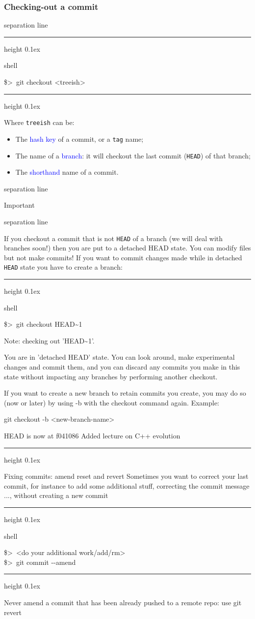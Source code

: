 \documentclass[hyperref={colorlinks}]{beamer}
\newenvironment{shell}{%
\footnotesize\flushleft\hrule height 0.1ex
\tt\begin{beamercolorbox}[sep=1ex,left]{shell}%
}{%
\end{beamercolorbox}
\hrule height 0.1ex
\endflushleft\par
}
\newcommand*{\psone}[1][ant]{\$>~}
\newcommand{\titleline}[1][0.025cm]{%
\begin{beamercolorbox}[wd=\paperwidth,ht=#1,center]{separation line}%
\end{beamercolorbox}%
}
\begin{document}
\begin{frame}
  \frametitle{Checking-out a commit}
\titleline
  \begin{shell}
    \psone git checkout <treeish> 
  \end{shell}

  Where \texttt{treeish} can be:
  \begin{itemize}
  \item The \textcolor{blue}{hash key} of a commit, or a \texttt{tag} name;
  \item The name of a \textcolor{blue}{branch}: it will checkout the
    last commit (\texttt{HEAD}) of that branch;
  \item The \textcolor{blue}{shorthand} name of a commit.
  \end{itemize}
\titleline
\end{frame}

\begin{frame}{Important}
  \titleline
  If you checkout a commit that is not \texttt{HEAD} of a branch (we
  will deal with branches soon!) then you are put to a \alert{detached
    HEAD state}. You can modify files but not make
  commits! If you want to commit changes made while in detached \texttt{HEAD} state you have to create a branch:
  \small
  \begin{shell}
\psone git checkout HEAD\textasciitilde{}1

Note: checking out 'HEAD\textasciitilde{}1'.

You are in 'detached HEAD' state. You can look around, make experimental
changes and commit them, and you can discard any commits you make in this
state without impacting any branches by performing another checkout.

If you want to create a new branch to retain commits you create, you may
do so (now or later) by using -b with the checkout command again. Example:

  git checkout -b <new-branch-name>

HEAD is now at f041086 Added lecture on C++ evolution
  \end{shell}

\end{frame}
\begin{frame}{Fixing commits: amend reset and revert}
Sometimes you want to correct your \alert{last commit}, for instance to add some additional stuff, correcting the commit message ..., without creating a new commit
\begin{shell}
\psone <do your additional work/add/rm>\\
\psone git commit -{}-amend
\end{shell}
\smallskip

\alert{Never amend a commit that has been already pushed to a remote repo: use git revert}
\end{frame}
\end{document}
